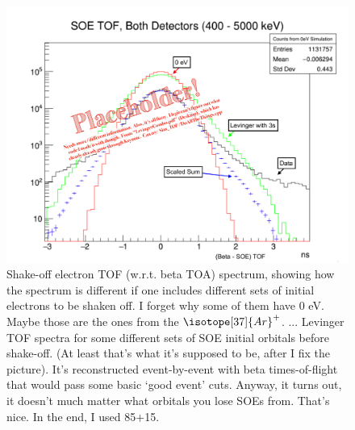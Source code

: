 %
%
\begin{figure}[h!!t]
	\centering
	\includegraphics[width=.999\linewidth]
	{Figures/Levinger_SOETOF_prelim.pdf}
	\caption[Levinger TOF]{Shake-off electron TOF (w.r.t. beta TOA) spectrum, showing how the spectrum is different if one includes different sets of initial electrons to be shaken off.  I forget why some of them have 0 eV.  Maybe those are the ones from the $\isotope[37]{Ar}^+$. ... Levinger TOF spectra for some different sets of SOE initial orbitals before shake-off.  (At least that's what it's supposed to be, after I fix the picture).  It's reconstructed event-by-event with beta times-of-flight that would pass some basic `good event' cuts.  Anyway, it turns out, it doesn't much matter what orbitals you lose SOEs from.  That's nice.  In the end, I used 85+15.   }	
	\label{fig:levinger_TOF}
\end{figure}
